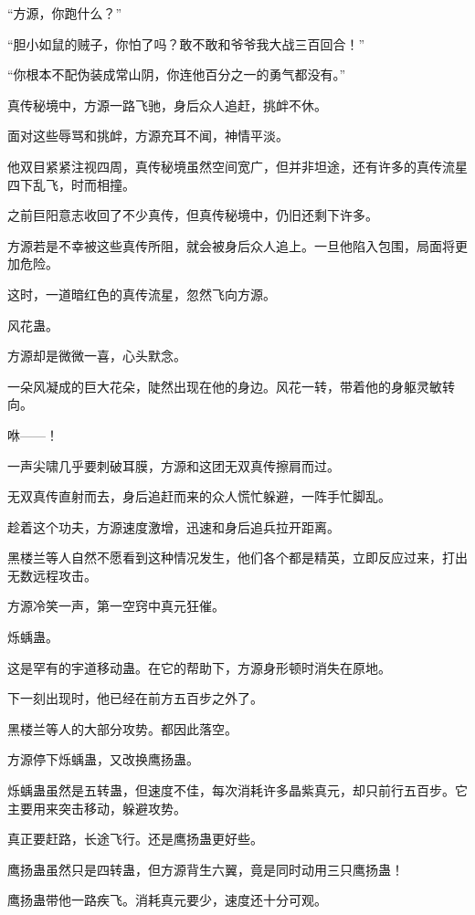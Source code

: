 
\begin{this_body}

“方源，你跑什么？”

“胆小如鼠的贼子，你怕了吗？敢不敢和爷爷我大战三百回合！”

“你根本不配伪装成常山阴，你连他百分之一的勇气都没有。”

真传秘境中，方源一路飞驰，身后众人追赶，挑衅不休。

面对这些辱骂和挑衅，方源充耳不闻，神情平淡。

他双目紧紧注视四周，真传秘境虽然空间宽广，但并非坦途，还有许多的真传流星四下乱飞，时而相撞。

之前巨阳意志收回了不少真传，但真传秘境中，仍旧还剩下许多。

方源若是不幸被这些真传所阻，就会被身后众人追上。一旦他陷入包围，局面将更加危险。

这时，一道暗红色的真传流星，忽然飞向方源。

风花蛊。

方源却是微微一喜，心头默念。

一朵风凝成的巨大花朵，陡然出现在他的身边。风花一转，带着他的身躯灵敏转向。

咻——！

一声尖啸几乎要刺破耳膜，方源和这团无双真传擦肩而过。

无双真传直射而去，身后追赶而来的众人慌忙躲避，一阵手忙脚乱。

趁着这个功夫，方源速度激增，迅速和身后追兵拉开距离。

黑楼兰等人自然不愿看到这种情况发生，他们各个都是精英，立即反应过来，打出无数远程攻击。

方源冷笑一声，第一空窍中真元狂催。

烁蝺蛊。

这是罕有的宇道移动蛊。在它的帮助下，方源身形顿时消失在原地。

下一刻出现时，他已经在前方五百步之外了。

黑楼兰等人的大部分攻势。都因此落空。

方源停下烁蝺蛊，又改换鹰扬蛊。

烁蝺蛊虽然是五转蛊，但速度不佳，每次消耗许多晶紫真元，却只前行五百步。它主要用来突击移动，躲避攻势。

真正要赶路，长途飞行。还是鹰扬蛊更好些。

鹰扬蛊虽然只是四转蛊，但方源背生六翼，竟是同时动用三只鹰扬蛊！

鹰扬蛊带他一路疾飞。消耗真元要少，速度还十分可观。


\end{this_body}
